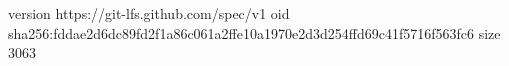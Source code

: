 version https://git-lfs.github.com/spec/v1
oid sha256:fddae2d6dc89fd2f1a86c061a2ffe10a1970e2d3d254ffd69c41f5716f563fc6
size 3063
